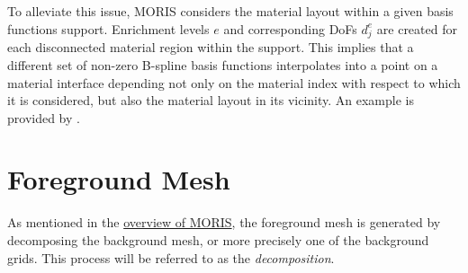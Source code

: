 To alleviate this issue, MORIS considers the material layout within a given basis functions support. Enrichment levels $e$ and corresponding DoFs $d_{j}^{e}$ are created for each disconnected material region within the support. This implies that a different set of non-zero B-spline basis functions interpolates into a point on a material interface depending not only on the material index with respect to which it is considered, but also the material layout in its vicinity. An example is provided by .

\section{Foreground Mesh}
\label{sec:overview_foreground}

As mentioned in the \hyperlink{moris_overview}{overview of MORIS}, the foreground mesh is generated by decomposing the background mesh, or more precisely one of the background grids. This process will be referred to as the \emph{decomposition}.

